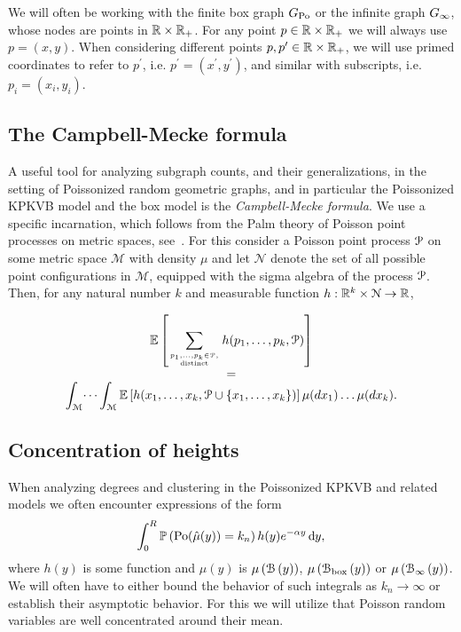 \begin{remark}
We will often be working with the finite box graph $G_{{\mathrm{Po}}}$ or the infinite graph $G_{\infty}$, whose nodes are points 
in ${\mathbb R} \times {\ensuremath{\mathbb R}}_+$. For any point $p \in {\ensuremath{\mathbb R}} \times {\ensuremath{\mathbb R}}_+$ we will always use $p = (x,y)$. 
When considering different points $p,p^\prime \in {\ensuremath{\mathbb R}} \times {\ensuremath{\mathbb R}}_+$, we will use primed coordinates to refer 
to $p^\prime$, i.e. $p^\prime = (x^\prime ,y^\prime)$, and similar with subscripts, i.e. $p_i = (x_i,y_i)$.
\end{remark}

\subsection{The Campbell-Mecke formula}

A useful tool for analyzing subgraph counts, and their generalizations, in the 
setting of Poissonized random geometric graphs, and in particular the Poissonized KPKVB model and the box 
model is the \emph{Campbell-Mecke formula}. 
We use a specific incarnation, which follows from the Palm theory of Poisson point processes on metric 
spaces, see~\cite{last2017lectures}. For this consider a Poisson point process ${\mathcal P}$ on some metric 
space $\mathcal{M}$ with density $\mu$ and let $\mathcal{N}$ denote the set of all possible point configurations 
in $\mathcal{M}$, equipped with the sigma algebra of the process ${\mathcal P}$. 
Then, for any natural number $k$ and measurable function $h : {\mathbb R}^k \times \mathcal{N} \to {\ensuremath{\mathbb R}}$,

\begin{equation}\label{eq:def_campbell_mecke}
\begin{array}{c}
\displaystyle	\mathbb{E}\left[\sum_{p_1, \dots, p_k \in {\mathcal P}, \atop \text{distinct}} h(p_1, \dots, p_k, {\mathcal P})\right] \\
= \\
\displaystyle \int_{\mathcal{M}} \dots \int_{\mathcal{M}} \mathbb{E}\left[h(x_1,\dots, x_k, {\mathcal P}\cup\{x_1,\dots,x_k\})\right] \mu(dx_1)\dots\mu(dx_k).
\end{array}
\end{equation}

\subsection{Concentration of heights}

When analyzing degrees and clustering in the Poissonized KPKVB and related models we often encounter expressions of the form
\begin{equation}\label{eq:example_poisson_integral}
	\int_{0}^R \mathbb{P}\left({\mathrm{Po}}(\hat{\mu}(y)) = k_n\right) h(y) e^{-\alpha y} \operatorname{\mathrm{d}\hspace{-2pt}} y,
\end{equation}
where $h(y)$ is some function and $\hat{\mu}(y)$ is $\mu\left({\mathcal B}\left(y\right)\right)$, $\mu\left({\mathcal B}_{\text{box}}\left(y\right)\right)$ or $\mu\left({\mathcal B}_{\infty}\left(y\right)\right)$. We will often have to either bound the behavior of such integrals as $k_n \to \infty$ or establish their asymptotic behavior. For this we will utilize that Poisson random variables are well concentrated around their mean. 

